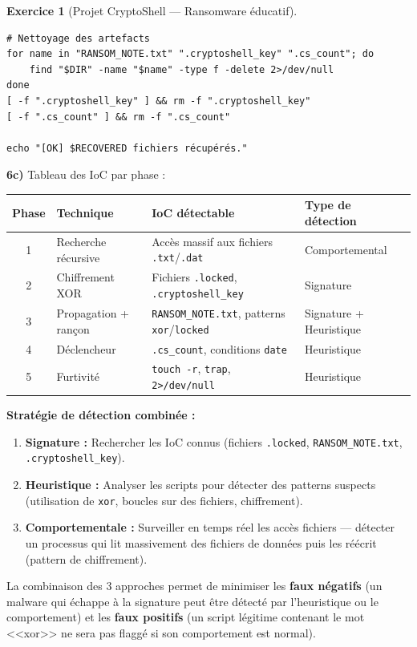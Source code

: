 \documentclass[a4paper,11pt]{article}
\theoremstyle{plain}
\theoremstyle{definition}
\newtheorem{exercice}{Exercice}
\begin{document}
\begin{exercice}[Projet CryptoShell --- Ransomware éducatif]
\begin{correction}
\begin{lstlisting}[title=recovery.sh (phase6\_recovery.sh)]
# Nettoyage des artefacts
for name in "RANSOM_NOTE.txt" ".cryptoshell_key" ".cs_count"; do
    find "$DIR" -name "$name" -type f -delete 2>/dev/null
done
[ -f ".cryptoshell_key" ] && rm -f ".cryptoshell_key"
[ -f ".cs_count" ] && rm -f ".cs_count"

echo "[OK] $RECOVERED fichiers récupérés."
\end{lstlisting}

\textbf{6c)} Tableau des IoC par phase :

\begin{center}
\begin{tabular}{clp{4cm}l}
\toprule
\textbf{Phase} & \textbf{Technique} & \textbf{IoC détectable} & \textbf{Type de détection} \\
\midrule
1 & Recherche récursive & Accès massif aux fichiers \texttt{.txt}/\texttt{.dat} & Comportemental \\
2 & Chiffrement XOR & Fichiers \texttt{.locked}, \texttt{.cryptoshell\_key} & Signature \\
3 & Propagation + rançon & \texttt{RANSOM\_NOTE.txt}, patterns \texttt{xor}/\texttt{locked} & Signature + Heuristique \\
4 & Déclencheur & \texttt{.cs\_count}, conditions \texttt{date} & Heuristique \\
5 & Furtivité & \texttt{touch -r}, \texttt{trap}, \texttt{2>/dev/null} & Heuristique \\
\bottomrule
\end{tabular}
\end{center}

\textbf{Stratégie de détection combinée :}
\begin{enumerate}
    \item \textbf{Signature :} Rechercher les IoC connus (fichiers \texttt{.locked}, \texttt{RANSOM\_NOTE.txt}, \texttt{.cryptoshell\_key}).
    \item \textbf{Heuristique :} Analyser les scripts pour détecter des patterns suspects (utilisation de \texttt{xor}, boucles sur des fichiers, chiffrement).
    \item \textbf{Comportementale :} Surveiller en temps réel les accès fichiers --- détecter un processus qui lit massivement des fichiers de données puis les réécrit (pattern de chiffrement).
\end{enumerate}

La combinaison des 3 approches permet de minimiser les \textbf{faux négatifs} (un malware qui échappe à la signature peut être détecté par l'heuristique ou le comportement) et les \textbf{faux positifs} (un script légitime contenant le mot <<xor>> ne sera pas flaggé si son comportement est normal).


\end{correction}
\end{exercice}
\end{document}
